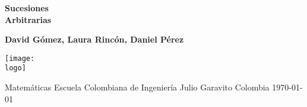 \documentclass{article}
\newcommand{\logo}{"C:/Users/usuario/OneDrive/Documentos/U/logo-eci.png"}
\newcommand{\titlename}{Sucesiones \\[10pt] Arbitrarias}%
\renewcommand{\author}{{David Gómez, Laura Rincón, Daniel Pérez}}
\begin{document}
\begin{titlepage}
    \begin{center}
        \vspace*{1cm}

        \textbf{\Huge{\titlename}}

        \vspace{1.5cm}

        \textbf{\Large{\author}}

        \vspace{3cm}

        \texttt{[image: \\logo]}

        \vfill

        Matemáticas\linebreak
        Escuela Colombiana de Ingeniería Julio Garavito\linebreak
        Colombia\linebreak
        \today

    \end{center}
\end{titlepage}

\clearpage
\tableofcontents
\clearpage












\end{document}

